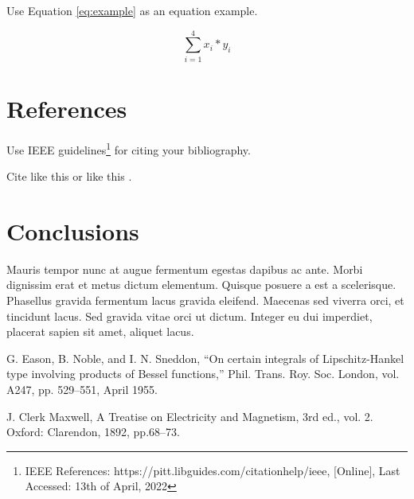 \documentclass[12pt]{article}
\begin{document}
Use Equation \ref{eq:example} as an equation example.

\begin{equation}
\label{eq:example}
\sum_{i=1}^{4} x_i * y_i
\end{equation}

\section{References}

Use IEEE guidelines\footnote{IEEE References: https://pitt.libguides.com/citationhelp/ieee, [Online], Last Accessed: 13th of April, 2022} for citing your bibliography.

Cite like this \cite{b1} or like this \cite{b1, b2}.

\section{Conclusions}
Mauris tempor nunc at augue fermentum egestas dapibus ac ante. Morbi dignissim erat et metus dictum elementum. Quisque posuere a est a scelerisque. Phasellus gravida fermentum lacus gravida eleifend. Maecenas sed viverra orci, et tincidunt lacus. Sed gravida vitae orci ut dictum. Integer eu dui imperdiet, placerat sapien sit amet, aliquet lacus.

\begin{flushleft}
    \begin{thebibliography}{99}

     G. Eason, B. Noble, and I. N. Sneddon, ``On certain integrals of Lipschitz-Hankel type involving products of Bessel functions,'' Phil. Trans. Roy. Soc. London, vol. A247, pp. 529--551, April 1955.

     J. Clerk Maxwell, A Treatise on Electricity and Magnetism, 3rd ed., vol. 2. Oxford: Clarendon, 1892, pp.68--73.

    \end{thebibliography}
\end{flushleft}
\end{document}
